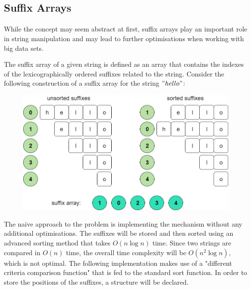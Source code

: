 \documentclass[letterpaper]{article}
\begin{document}
\subsection{Suffix Arrays}

\paragraph{}

While the concept may seem abstract at first, suffix arrays play an important role in string manipulation and may lead to further optimisations when working with big data sets.

The suffix array of a given string is defined as an array that contains the indexes of the lexicographically ordered suffixes related to the string. Consider the following construction of a suffix array for the string $"hello"$:


\begin{figure} [h!]
\centering
\includegraphics[width=1\textwidth]{pngOfDiagrams/suffixarray1.png}
\end{figure}

The naive approach to the problem is implementing the mechanism without any additional optimisations. The suffixes will be stored and then sorted using an advanced sorting method that takes $O(n \log n)$ time. Since two strings are compared in $O(n)$ time, the overall time complexity will be $O(n^2 \log n)$, which is not optimal. The following implementation makes use of a "different criteria comparison function" that is fed to the standard sort function. In order to store the positions of the suffixes, a structure will be declared.
\end{document}
